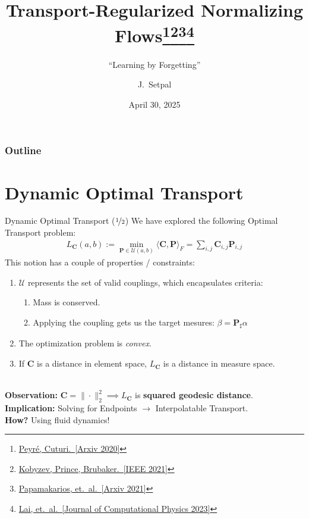 \documentclass{beamer}
\title[Normalizing Flows]{Transport-Regularized Normalizing Flows\thanks{\href{https://arxiv.org/abs/1803.00567}{Peyré, Cuturi.~[Arxiv 2020]}}\thanks{\href{https://arxiv.org/abs/1908.09257}{Kobyzev, Prince, Brubaker.~[IEEE 2021]}}\thanks{\href{https://arxiv.org/abs/1912.02762}{Papamakarios, et.~al.~[Arxiv 2021]}}\thanks{\href{https://arxiv.org/abs/2206.14990}{Lai, et.~al.~[Journal of Computational Physics 2023]}}}
\subtitle{``Learning by Forgetting''}
\author[ECE ML Reading Group] %
{J.~Setpal}
\date{April 30, 2025}
\begin{document}
\frame{\titlepage}


\begin{frame}
\frametitle{Outline}
\tableofcontents
\end{frame}

\section{Dynamic Optimal Transport}

\begin{frame}{Dynamic Optimal Transport ($\nicefrac{1}{2}$)}
	We have explored the following Optimal Transport problem:
	\begin{gather}
		L_{\bm{C}}(a, b) := \min_{\bm{P} \in \mathcal{U}(a, b)} \langle \bm{C}, \bm{P} \rangle_F = \sum_{i, j} \bm{C}_{i,j} \bm{P}_{i, j}
	\end{gather} \pause
	This notion has a couple of properties / constraints:
	\begin{enumerate}[label=\arabic*.]
		\item $\mathcal{U}$ represents the set of valid couplings, which encapsulates criteria:
			\begin{enumerate}[label=\alph*.]
				\item Mass is conserved.
				\item Applying the coupling gets us the target mesures: $\beta = \bm{P}_\sharp \alpha$
			\end{enumerate}
		\item The optimization problem is \textit{convex}.
		\item If $\bm{C}$ is a distance in element space, $L_{\bm{C}}$ is a distance in measure space.
	\end{enumerate} \pause ~\\
	\textbf{Observation:} $\bm{C} = \| \cdot \|_2^2 \implies L_{\bm{C}}$ is \textbf{squared geodesic distance}. \pause \\
	\textbf{Implication:} Solving for Endpoints $\rightarrow$ Interpolatable Transport. \pause \newline \\

	\textbf{How?} Using fluid dynamics!
\end{frame}
\end{document}
